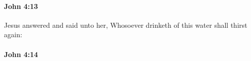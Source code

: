 		\paragraph{John 4:13} %
			\label{JOHN-4-13}

			Jesus answered and said unto her, Whosoever drinketh of this water shall thirst again:

			\begin{framed}
			\scriptsize
				\begin{compactdesc}
					\item[SBLG] 
				\end{compactdesc}
			\end{framed}

		\paragraph{John 4:14} %
			\label{JOHN-4-14}

